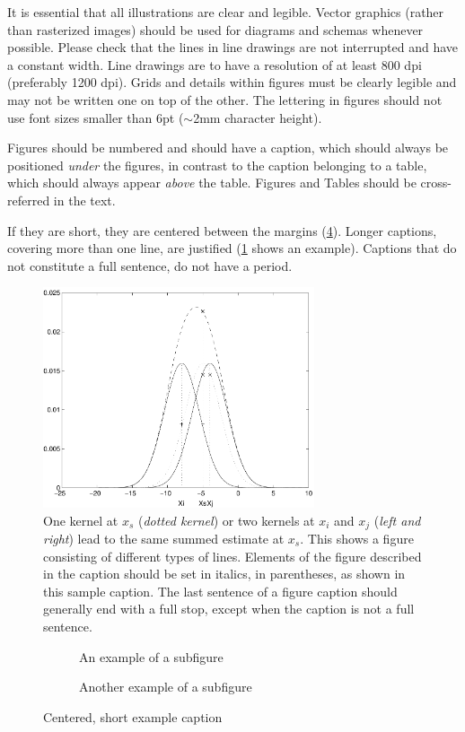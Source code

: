 \documentclass[runningheads]{llncs}
\begin{document}
It is essential that all illustrations are clear and legible. 
Vector graphics (rather than rasterized images) should be used for diagrams and schemas whenever possible. 
Please check that the lines in line drawings are not interrupted and have a constant width. 
Line drawings are to have a resolution of at least 800 dpi (preferably 1200 dpi).
Grids and details within figures must be clearly legible and may not be written one on top of the other. 
The lettering in figures should not use font sizes smaller than 6\:pt ($\sim$2\:mm character height). 

Figures should be numbered and should have a caption, which should always be positioned \emph{under} the figures, in contrast to the caption belonging to a table, which should always appear \emph{above} the table.
Figures and Tables should be cross-referred in the text.

If they are short, they are centered between the margins (\cf \cref{fig:short}). 
Longer captions, covering more than one line, are justified (\cref{fig:example} shows an example). 
Captions that do not constitute a full sentence, do not have a period.


\begin{figure}[tb]
  \centering
  \includegraphics[height=6.5cm]{eijkel2}
  \caption{One kernel at $x_s$ (\emph{dotted kernel}) or two kernels at $x_i$ and $x_j$ (\emph{left and right}) lead to the same summed estimate at $x_s$.
    This shows a figure consisting of different types of lines.
    Elements of the figure described in the caption should be set in italics, in parentheses, as shown in this sample caption. 
    The last sentence of a figure caption should generally end with a full stop, except when the caption is not a full sentence.
  }
  \label{fig:example}
\end{figure}

\begin{figure}[tb]
  \centering
  \begin{subfigure}{0.68\linewidth}
    \fbox{\rule{0pt}{0.5in} \rule{.9\linewidth}{0pt}}
    \caption{An example of a subfigure}
    \label{fig:short-a}
  \end{subfigure}
  \hfill
  \begin{subfigure}{0.28\linewidth}
    \fbox{\rule{0pt}{0.5in} \rule{.9\linewidth}{0pt}}
    \caption{Another example of a subfigure}
    \label{fig:short-b}
  \end{subfigure}
  \caption{Centered, short example caption}
  \label{fig:short}
\end{figure}
\end{document}
